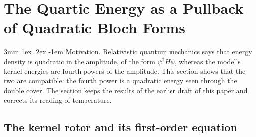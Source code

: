 \documentclass[%
 reprint, amsmath,amssymb, aps, prb, ]{revtex4-2}
\makeatletter
\numberwithin{equation}{section}
\renewcommand\paragraph{%
  \@startsection{paragraph}{4}{\z@}%
    {3mm \@plus 1ex \@minus .2ex}
    {-1em}
    {\normalfont\normalsize\itshape}}
\makeatother
\begin{document}
\section{The Quartic Energy as a Pullback of Quadratic Bloch Forms}
\label{sec:quartic}

\paragraph{Motivation.} Relativistic quantum mechanics says that energy density is quadratic in the amplitude, of the form $\psi^\dagger H\psi$, whereas the model's kernel energies are fourth powers of the amplitude. This section shows that the two are compatible: the fourth power is a quadratic energy seen through the double cover. The section keeps the results of the earlier draft of this paper and corrects its reading of temperature.

\subsection{The kernel rotor and its first-order equation}
\end{document}
